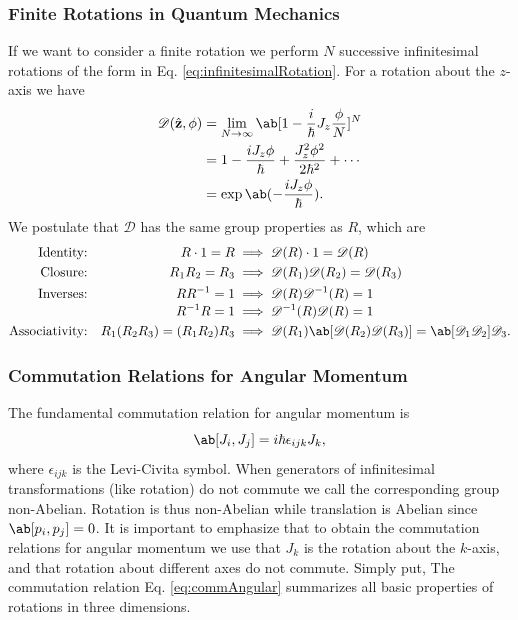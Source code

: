 \subsubsection{Finite Rotations in Quantum Mechanics}
If we want to consider a finite rotation we perform $N$ successive infinitesimal rotations of the form in Eq. \eqref{eq:infinitesimalRotation}. For a rotation about the $z$-axis we have 
\begin{align}
    \mathscr{D}(\hat{\vec{z}}, \phi) &= \lim_{N\to\infty} \ab [ 1 -\frac{i}{\hbar} J_z \frac{\phi}{N} ]^N\\
    &= 1 - \frac{i J_z \phi}{\hbar} + \frac{J_z^2 \phi^2}{2\hbar^2} + \cdots \\
    &= \exp\ab(-\frac{i J_z \phi}{\hbar}).
\end{align}
We postulate that $\mathscr{D}$ has the same group properties as $R$, which are
\begin{subequations}\begin{align}
    \text{Identity:}&&  R\cdot 1 = R &\implies \mathscr{D}(R) \cdot 1 = \mathscr{D}(R)\\
    \text{Closure:}&&  R_1R_2 = R_3 &\implies \mathscr{D}(R_1)\mathscr{D}(R_2) = \mathscr{D}(R_3)\\
    \text{Inverses:}&& R R^{-1} =1 &\implies \mathscr{D}(R) \mathscr{D}^{-1}(R) = 1 \\[-0.2\baselineskip]
    &&  R^{-1}R =1 &\implies \mathscr{D}^{-1}(R) \mathscr{D}(R) = 1 \\
    \text{Associativity:}&& R_1(R_2 R_3) = (R_1 R_2) R_3 &\implies \mathscr{D}(R_1) \ab[\mathscr{D}(R_2) \mathscr{D}(R_3)] = \ab[\mathscr{D}_1 \mathscr{D}_2] \mathscr{D}_3.
\end{align}\end{subequations}

\subsubsection{Commutation Relations for Angular Momentum}
The fundamental commutation relation for angular momentum is 
\begin{equation}
    \comm{J_i}{J_j} = i \hbar \epsilon_{ijk} J_k,\label{eq:commAngular}
\end{equation}
where $\epsilon_{ijk}$ is the Levi-Civita symbol. When generators of infinitesimal transformations (like rotation) do not commute we call the corresponding group non-Abelian. Rotation is thus non-Abelian while translation is Abelian since $\comm{p_i}{p_j} = 0$. It is important to emphasize that to obtain the commutation relations for angular momentum we use that $J_k$ is the rotation about the $k$-axis, and that rotation about different axes do not commute. Simply put, The commutation relation Eq. \eqref{eq:commAngular} summarizes all basic properties of rotations in three dimensions.

